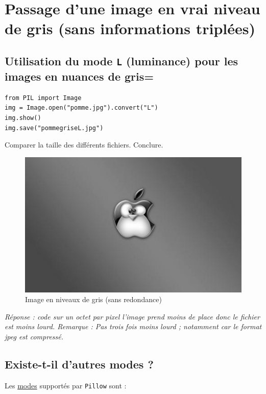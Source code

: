 \documentclass[11pt]{article}
\begin{document}
\section{Passage d'une image en vrai niveau de gris (sans informations triplées)}
\label{sec:org1941b7e}


\subsection{Utilisation du mode \texttt{L} (luminance) pour les images en nuances de gris=}
\label{sec:org6b27ac4}

\begin{verbatim}
from PIL import Image
img = Image.open("pomme.jpg").convert("L")
img.show()
img.save("pommegriseL.jpg")
\end{verbatim}

Comparer la taille des différents fichiers. Conclure.

\begin{figure}[htbp]
\centering
\includegraphics[width=.9\linewidth]{pommegriseL.jpg}
\caption{Image en niveaux de gris (sans redondance)}
\end{figure}


\emph{Réponse : code sur un octet par pixel l'image prend moins de place donc le fichier est moins lourd. Remarque : Pas trois fois moins lourd ; notamment car le format jpeg est compressé.}

\subsection{Existe-t-il d'autres modes ?}
\label{sec:org22a6150}

Les \href{https://pillow.readthedocs.io/en/latest/handbook/concepts.html\#modes}{modes} supportés par \texttt{Pillow} sont : 
\end{document}
